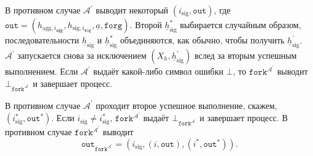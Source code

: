 \documentclass{mrl}
\theoremstyle{definition}
\numberwithin{theorem}{subsection}
\newcommand{\adversary}{\mathcal{A}}
\begin{document}
В противном случае $\adversary^\prime$ выводит некоторый $(i_{\text{sig}}, \texttt{out})$, где $\texttt{out} = (h_{\text{agg}, i_{\texttt{agg}}}, h_{\text{sig}, i_{\texttt{sig}}}, \underline{a}, \texttt{forg})$. Второй $\underline{h}_{\text{sig}}^*$ выбирается случайным образом, последовательности $\underline{h}_{\text{sig}}$ и $\underline{h}_{\text{sig}}^*$ объединяются, как обычно, чтобы получить $\underline{h}_{\text{sig}}^\prime$. $\adversary^\prime$ запускается снова за исключением $(X_h, \underline{h}_{\text{sig}}^\prime)$ вслед за вторым успешным выполнением. Если $\adversary^\prime$ выдаёт какой-либо символ ошибки $\bot$, то $\texttt{fork}^{\adversary^\prime}$ выводит $\bot_{\texttt{fork}^{\adversary^\prime}}$ и завершает процесс.

В противном случае $\adversary^{\prime}$ проходит второе успешное выполнение, скажем, $(i_{\text{sig}}^*, \texttt{out}^*)$. Если $i_{\text{sig}} \neq i_{\text{sig}}^*$, $\texttt{fork}^{\adversary^\prime}$ выдаёт $\bot_{\texttt{fork}^{\adversary^\prime}}$ и завершает процесс. В противном случае $\texttt{fork}^{\adversary^\prime}$ выводит \[\texttt{out}_{\texttt{fork}^{\adversary^\prime}} = (i_{\text{sig}}, (i, \texttt{out}), (i^*, \texttt{out}^*)).\]
\end{document}
